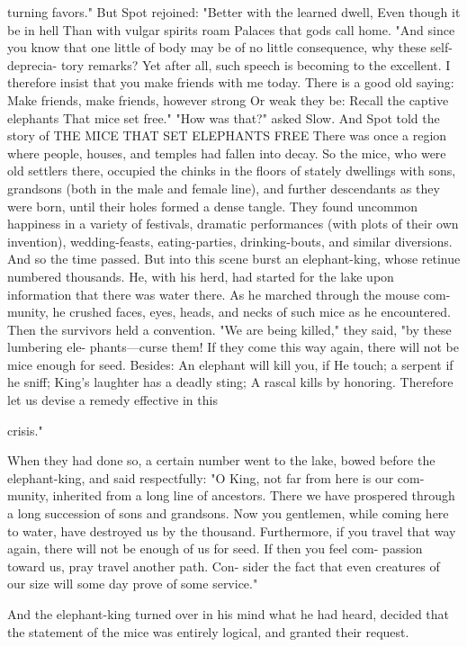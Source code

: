 \documentclass{book}
\begin{document}
turning favors." But Spot rejoined:
"Better with the learned dwell,
Even though it be in hell
Than with vulgar spirits roam
Palaces that gods call home.
"And since you know that one little of body may
be of no little consequence, why these self-deprecia-
tory remarks? Yet after all, such speech is becoming
to the excellent. I therefore insist that you make
friends with me today. There is a good old saying:
Make friends, make friends, however strong
Or weak they be:
Recall the captive elephants
That mice set free."
"How was that?" asked Slow. And Spot told the
story of
THE MICE THAT SET ELEPHANTS FREE
There was once a region where people, houses, and
temples had fallen into decay. So the mice, who were
old settlers there, occupied the chinks in the floors
of stately dwellings with sons, grandsons (both in the
male and female line), and further descendants as
they were born, until their holes formed a dense
tangle. They found uncommon happiness in a variety
of festivals, dramatic performances (with plots of
their own invention), wedding-feasts, eating-parties,
drinking-bouts, and similar diversions. And so the
time passed.
But into this scene burst an elephant-king, whose
retinue numbered thousands. He, with his herd, had
started for the lake upon information that there was
water there. As he marched through the mouse com-
munity, he crushed faces, eyes, heads, and necks of
such mice as he encountered.
Then the survivors held a convention. "We are
being killed," they said, "by these lumbering ele-
phants---curse them! If they come this way again,
there will not be mice enough for seed. Besides:
An elephant will kill you, if
He touch; a serpent if he sniff;
King's laughter has a deadly sting;
A rascal kills by honoring.
Therefore let us devise a remedy effective in this

crisis."

When they had done so, a certain number went
to the lake, bowed before the elephant-king, and said
respectfully: "O King, not far from here is our com-
munity, inherited from a long line of ancestors. There
we have prospered through a long succession of sons
and grandsons. Now you gentlemen, while coming
here to water, have destroyed us by the thousand.
Furthermore, if you travel that way again, there will
not be enough of us for seed. If then you feel com-
passion toward us, pray travel another path. Con-
sider the fact that even creatures of our size will some
day prove of some service."

And the elephant-king turned over in his mind
what he had heard, decided that the statement of the
mice was entirely logical, and granted their request.
\end{document}
